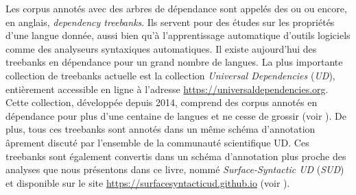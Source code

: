 {    Les corpus annotés avec des arbres de dépendance sont appelés des  ou  ou encore, en anglais, \textit{{dependency treebanks}}. Ils servent pour des études sur les propriétés d’une langue donnée, aussi bien qu’à l’apprentissage automatique d’outils logiciels comme des analyseurs syntaxiques automatiques. Il existe aujourd'hui des treebanks en dépendance pour un grand nombre de langues. La plus importante collection de treebanks actuelle est la collection \textit{Universal Dependencies} (\textit{UD}), entièrement accessible en ligne à l'adresse \url{https://universaldependencies.org}. Cette collection, développée depuis 2014, comprend des corpus annotés en dépendance pour plus d'une centaine de langues et ne cesse de grossir (voir \citealt{nivre2016universal}). De plus, tous ces treebanks sont annotés dans un même schéma d'annotation âprement discuté par l'ensemble de la communauté scientifique UD. Ces treebanks sont également convertis dans un schéma d'annotation plus proche des analyses que nous présentons dans ce livre, nommé \textit{Surface-Syntactic UD} (\textit{SUD}) et disponible sur le site \url{https://surfacesyntacticud.github.io} (voir \citealt{gerdes2018sud}).
}\largerpage[2]
